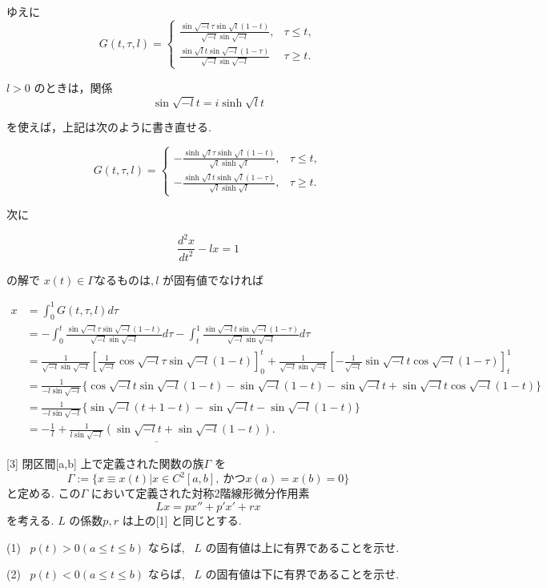\documentclass{jsarticle}
\begin{document}
ゆえに
$$
G(t, \tau, l) 
=\begin{cases}\frac{\sin{ \sqrt{-l}} \tau \sin \sqrt{l}(1-t)}{\sqrt{-l} \sin \sqrt{-l}}, & \tau \leq t, \\ 
\frac{\sin \sqrt{l} t \sin \sqrt{-l}(1-\tau)}{\sqrt{-l} \sin \sqrt{-l}} & \tau \geq t .\end{cases}
$$

$l>0$ のときは，関係
$$
\sin \sqrt{-l} t=i \sinh \sqrt{l} t
$$

を使えば，上記は次のように書き直せる.

$$
G(t, \tau, l) 
=\begin{cases}-\frac{\sinh \sqrt{l} \tau \sinh \sqrt{l}(1-t)}{\sqrt{l} \sinh \sqrt{l}}, & \tau \leq t, \\ 
-\frac{\sinh \sqrt{l} t \sinh \sqrt{l}(1-\tau)}{\sqrt{l} \sinh \sqrt{l}}, & \tau \geq t .\end{cases}
$$

次に

$$
\frac{d^{2} x}{d t^{2}}-l x=1
$$

の解で $x(t) \in \Gamma な る も の は, l$ が固有値でなければ

$$
\begin{aligned}
x
&=\int_{0}^{1} G(t, \tau, l) d \tau \\
&= -\int_0^t \frac{\sin \sqrt{-l} \tau \sin\sqrt{-l}(1-t)}{\sqrt{-l}\sin\sqrt{-l}} d\tau
- \int_t^1 \frac{\sin \sqrt{-l}t \sin\sqrt{-l}(1-\tau)}{\sqrt{-l}\sin\sqrt{-l}} d\tau \\
&= \frac{1}{\sqrt{-l} \sin \sqrt{-l}} \left[\frac{1}{\sqrt{-l}} \cos\sqrt{-l}\tau\sin\sqrt{-l}(1-t) \right]_0^t
 + \frac{1}{\sqrt{-l} \sin \sqrt{-l}} \left[-\frac{1}{\sqrt{-l}}\sin\sqrt{-l}t\cos\sqrt{-l}(1-\tau) \right]_t^1 \\
&= \frac{1}{-l\sin\sqrt{-l}} \{\cos\sqrt{-l}t\sin\sqrt{-l}(1-t)-\sin\sqrt{-l}(1-t)-\sin\sqrt{-l}t + \sin\sqrt{-l}t\cos\sqrt{-l}(1-t) \} \\
&=\frac{1}{-l \sin \sqrt{-l}} \{\sin \sqrt{-l}(t+1-t)-\sin \sqrt{-l} t-\sin \sqrt{-l}(1-t) \} \\
&= \underline{-\frac{1}{l} + \frac{1}{l\sin\sqrt{-l}}(\sin\sqrt{-l}t + \sin\sqrt{-l}(1-t))}.
\end{aligned}
$$

\bigskip
\bigskip

\begin{itembox}[l]{[3]}
閉区間[a,b] 上で定義された関数の族$\Gamma$ を
$$
\Gamma := \{x\equiv x(t) | x \in C^2[a,b], \ かつx(a) = x(b) = 0 \}
$$
と定める. この$\Gamma$ において定義された対称2階線形微分作用素
$$
Lx = px'' + p'x' + rx
$$
を考える. $L$ の係数$p, r$ は上の[1] と同じとする.

(1) \ 
$p(t)>0(a \leq t \leq b)$ ならば, \ $L$ の固有値は上に有界であることを示せ.

(2) \ 
$p(t)<0(a \leq t \leq b)$ ならば, \ $L$ の固有値は下に有界であることを示せ.
  
\end{itembox}
\end{document}
